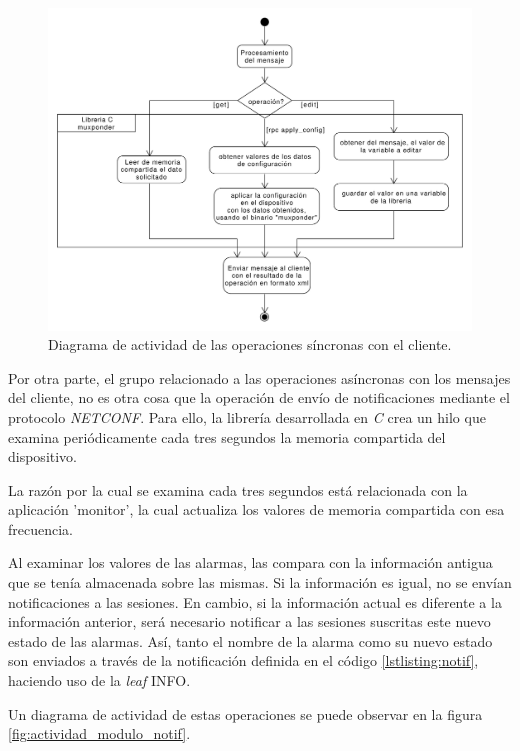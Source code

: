  \begin{figure}[H]
    \centering
    \includegraphics[scale=0.45]{Figures/actividad_modulo_sinc.pdf}
    \caption{Diagrama de actividad de las operaciones síncronas con el cliente.}
    \label{fig:actividad_modulo_sinc}
  \end{figure}

  Por otra parte, el grupo relacionado a las operaciones asíncronas con los mensajes del cliente, no es otra cosa que la operación de envío de notificaciones mediante el protocolo \textit{NETCONF}. Para ello, la librería desarrollada en \textit{C} crea un hilo que examina periódicamente cada tres segundos la memoria compartida del dispositivo. 
  
  La razón por la cual se examina cada tres segundos está relacionada con la aplicación 'monitor', la cual actualiza los valores de memoria compartida con esa frecuencia.

  Al examinar los valores de las alarmas, las compara con la información antigua que se tenía almacenada sobre las mismas. Si la información es igual, no se envían notificaciones a las sesiones. En cambio, si la información actual es diferente a la información anterior, será necesario notificar a las sesiones suscritas este nuevo estado de las alarmas. Así, tanto el nombre de la alarma como su nuevo estado son enviados a través de la notificación definida en el código \ref{lstlisting:notif}, haciendo uso de la \textit{leaf} INFO.
  
  Un diagrama de actividad de estas operaciones se puede observar en la figura \ref{fig:actividad_modulo_notif}.

